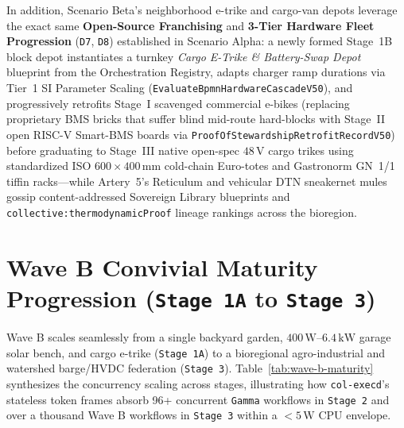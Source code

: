 In addition, Scenario Beta's neighborhood e-trike and cargo-van depots leverage the exact same
\textbf{Open-Source Franchising} and \textbf{3-Tier Hardware Fleet Progression} (\texttt{D7},
\texttt{D8}) established in Scenario Alpha: a newly formed Stage~1B block depot instantiates a
turnkey \emph{Cargo E-Trike \& Battery-Swap Depot} blueprint from the Orchestration Registry, adapts
charger ramp durations via Tier~1 SI Parameter Scaling (\texttt{EvaluateBpmnHardwareCascadeV50}), and
progressively retrofits Stage~I scavenged commercial e-bikes (replacing proprietary BMS bricks that
suffer blind mid-route hard-blocks with Stage~II open RISC-V Smart-BMS boards via
\texttt{ProofOfStewardshipRetrofitRecordV50}) before graduating to Stage~III native open-spec
$48\,\mathrm{V}$ cargo trikes using standardized ISO $600 \times 400\,\mathrm{mm}$ cold-chain Euro-totes
and Gastronorm GN~1/1 tiffin racks---while Artery~5's Reticulum and vehicular DTN sneakernet mules
gossip content-addressed Sovereign Library blueprints and \texttt{collective:thermodynamicProof}
lineage rankings across the bioregion.

\section{Wave B Convivial Maturity Progression (\texttt{Stage 1A} to \texttt{Stage 3})}
\label{sec:wave-b-maturity}

Wave B scales seamlessly from a single backyard garden, $400\,\mathrm{W}$--$6.4\,\mathrm{kW}$
garage solar bench, and cargo e-trike (\texttt{Stage 1A}) to a bioregional agro-industrial
and watershed barge/HVDC federation (\texttt{Stage 3}). Table~\ref{tab:wave-b-maturity}
synthesizes the concurrency scaling across stages, illustrating how \texttt{col-execd}'s
stateless token frames absorb 96+ concurrent \texttt{Gamma} workflows in \texttt{Stage 2}
and over a thousand Wave B workflows in \texttt{Stage 3} within a $< 5\,\mathrm{W}$ CPU
envelope.

